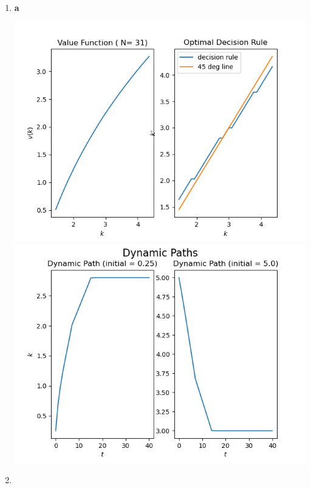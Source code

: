 \documentclass[12pt]{article}
\begin{document}
\begin{enumerate}
\item
	\begin{center}
		\textbf{a}\par\medskip
		\includegraphics[width=0.8\linewidth]{Q2fig1.png}
		\includegraphics[width=0.8\linewidth]{Q2fig2.png}
	\end{center}

\item 
		

\end{enumerate}
\end{document}
